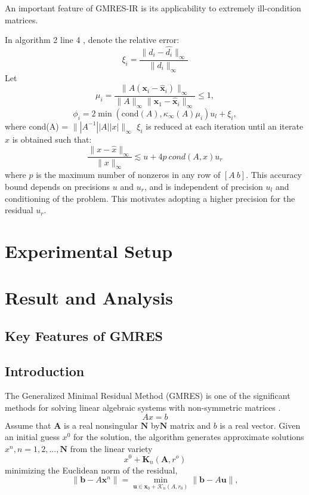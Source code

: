 \documentclass[12pt]{article}
\begin{document}
An important feature of GMRES-IR is its applicability to extremely ill-condition matrices.

In algorithm 2 line 4 , denote the relative error:
\[
    \xi_i = \frac{\|d_i - \hat{d_i}\|_{\infty}}{\|d_i\|_{\infty}}
\]
Let
\[
\mu_i = \frac{\|A(\mathbf{x}_i - \hat{\mathbf{x}}_i)\|_{\infty}}{\|A\|_{\infty}\|\mathbf{x}_1 - \hat{\mathbf{x}}_i\|_{\infty}} \leq 1,
\]
\[
\phi_i = 2 \min(\text{cond}(A), \kappa_{\infty}(A)\mu_i) u_l + \xi_i,
\]
where cond(A) = $\||A^{-1}||A||x|\|_\infty$
$\xi_i$ is reduced at each iteration until an iterate $\hat{x}$ is obtained such that:
\[
    \frac{\|x - \hat{x}\|_{\infty}}{\|x\|_{\infty}} \lesssim u+4p\ cond(A,x)u_r
\]
where $p$ is the maximum number of nonzeros in any row of $[A\ b]$. This accuracy bound depends on precisions $u$ and $u_r$, and is independent of precision $u_l$ and conditioning of the problem. This motivates adopting a higher precision for the residual $u_r$. 





\section{Experimental Setup}
\section{Result and Analysis}














\subsection{Key Features of GMRES}
\subsection{Introduction}
The Generalized Minimal Residual Method (GMRES) is one of the significant methods for solving linear algebraic systems with non-symmetric matrices .  \\
\begin{equation}
    Ax=b
\end{equation}
Assume that $\textbf{A}$ is a real nonsingular $\textbf{N}$ by$\textbf{N}$ matrix and $b$ is a real vector. Given an initial guess $x^0$ for the solution, the algorithm generates approximate solutions $x^n,n=1,2,...,\textbf{N}$ from the linear variety
\begin{equation}
    x^0+\textbf{K}_n(\textbf{A},r^o)
\end{equation}
minimizing the Euclidean norm of the residual,
\begin{equation}
    \| \mathbf{b} - A\mathbf{x}^n \| = \min_{\mathbf{u} \in \mathbf{x}_0 + \mathcal{K}_n(A,r_0)} \| \mathbf{b} - A\mathbf{u} \|,
\end{equation}
\end{document}
